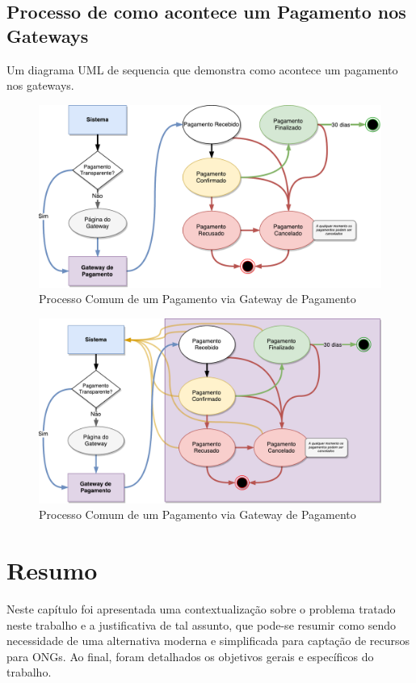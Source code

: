 \subsection{Processo de como acontece um Pagamento nos Gateways}

Um diagrama UML de sequencia que demonstra como acontece um pagamento nos gateways.

\begin{figure}[H]
	\caption{\label{fig_uml_gateway1}Processo Comum de um Pagamento via Gateway de Pagamento}
    \centering
    \includegraphics[scale=0.58]{imagens/Processo_Gateway_01.pdf}
\end{figure}

\begin{figure}[H]
	\caption{\label{fig_uml_gateway2}Processo Comum de um Pagamento via Gateway de Pagamento}
    \centering
    \includegraphics[scale=0.58]{imagens/Processo_Gateway_02.pdf}
\end{figure}




\section*{Resumo}
Neste capítulo foi apresentada uma contextualização sobre o problema tratado neste trabalho e a justificativa de tal assunto, que pode-se resumir como sendo necessidade de uma alternativa moderna e simplificada para captação de recursos para ONGs. Ao final, foram detalhados os objetivos gerais e específicos do trabalho.

